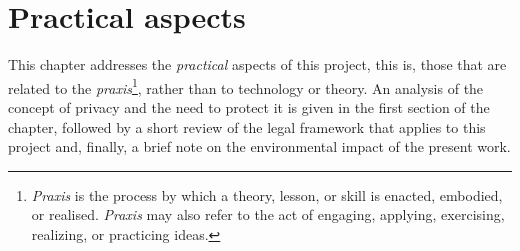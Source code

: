 \chapter{Practical aspects} %
\label{Chapter4PracticalAspects} %


This chapter addresses the \textit{practical} aspects of this project, this is, those that are related to the \textit{praxis}\footnote{\textit{Praxis} is the process by which a theory, lesson, or skill is enacted, embodied, or realised. \textit{Praxis} may also refer to the act of engaging, applying, exercising, realizing, or practicing ideas.}, rather than to technology or theory. An analysis of the concept of privacy and the need to protect it is given in the first section of the chapter, followed by a short review of the legal framework that applies to this project and, finally, a brief note on the environmental impact of the present work.




